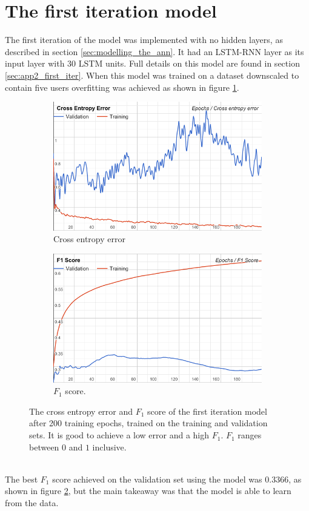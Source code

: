 \section{The first iteration model}
The first iteration of the model was implemented with no hidden layers, as described in section \ref{sec:modelling_the_ann}. It had an LSTM-RNN layer as its input layer with 30 LSTM units. Full details on this model are found in section \ref{sec:app2_first_iter}. When this model was trained on a dataset downscaled to contain five users overfitting was achieved as shown in figure \ref{fig:first_iter_overfitting}.
\begin{figure}[h!]
\begin{subfigure}{0.5\textwidth}
\includegraphics[width=1 \linewidth]{figure/results/first_iter_cross}
\caption{Cross entropy error}
\label{fig:first_iter_overfitting}
\end{subfigure}
\begin{subfigure}{0.5\textwidth}
\includegraphics[width=1\linewidth]{figure/results/first_iter_f1}
\caption{$F_1$ score.}
\label{fig:first_iter_f1}
\end{subfigure}
 
\caption{The cross entropy error and $F_1$ score of the first iteration model after 200 training epochs, trained on the training and validation sets. It is good to achieve a low error and a high $F_1$. $F_1$ ranges between $0$ and $1$ inclusive.}
\label{fig:image2}
\end{figure}
\\
The best $F_1$ score achieved on the validation set using the model was $0.3366$, as shown in figure \ref{fig:first_iter_f1}, but the main takeaway was that the model is able to learn from the data.

